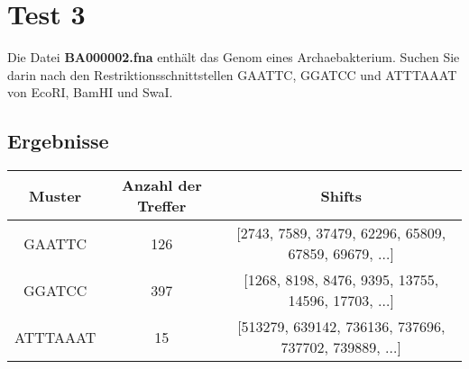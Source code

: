 \documentclass[a4paper,12pt]{article}
\begin{document}
\section*{Test 3}
Die Datei \textbf{BA000002.fna} enthält das Genom eines Archaebakterium.
Suchen Sie darin nach den Restriktionsschnittstellen GAATTC, GGATCC
und ATTTAAAT von EcoRI, BamHI und SwaI.

\subsection*{Ergebnisse}
\begin{tabular}{c|c|c}
Muster & Anzahl der Treffer & Shifts \\
\hline
GAATTC & 126 &  [2743, 7589, 37479, 62296, 65809, 67859, 69679, $\hdots$] \\
GGATCC & 397  & [1268, 8198, 8476, 9395, 13755, 14596, 17703, $\hdots$] \\
ATTTAAAT & 15 & [513279, 639142, 736136, 737696, 737702, 739889, $\hdots$]
\end{tabular}
\end{document}
